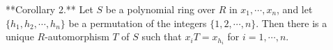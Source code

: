 **Corollary 2.** Let $S$ be a polynomial ring over $R$ in $x_1, \cdots, x_n$, and let $\{h_1, h_2, \cdots, h_n\}$ be a permutation of the integers $\{1, 2, \cdots, n\}$. Then there is a unique $R$-automorphism $T$ of $S$ such that $x_i T = x_{h_i}$ for $i = 1, \cdots, n$.
